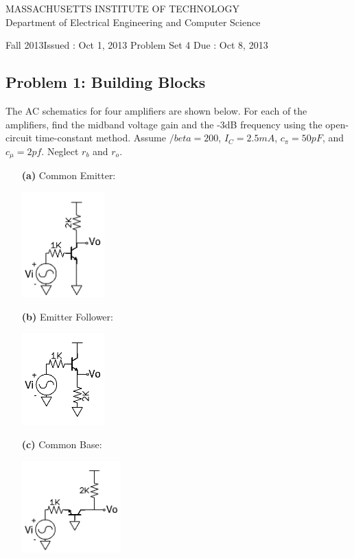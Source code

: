 \documentclass[11pt,twoside]{article}
\newlength{\toppush}
\newcommand{\htitle}[3]{\begin{center}
\vspace*{-\toppush}
{\large MASSACHUSETTS INSTITUTE OF TECHNOLOGY}\\
{\small Department of Electrical Engineering and Computer Science}\\
\vspace*{1ex}{\Large #2}\end{center}
\noindent
\newline\parbox{6.5in}
{Fall 2013\hfill Issued : #1 \newline
 Problem Set 4 \hfill Due : #3\newline
}}
\newcommand{\handout}[3]{\thispagestyle{empty}
\pagestyle{myheadings}\htitle{#1}{#2}{#3}}
\begin{document}
\handout{Oct 1, 2013}{6.301 Solid State Circuits}{Oct 8, 2013}
\setlength{\parindent}{0pt}

\newcommand{\solution}{
 \medskip
 {\bf Solution:}
}

\hrulefill

\flushleft

\subsection*{Problem 1: Building Blocks}
The AC schematics for four amplifiers are shown below.
For each of the amplifiers, find the midband voltage gain and the -3dB frequency using the open-circuit time-constant method.
Assume $/beta=200$, $I_C=2.5mA$, $c_\pi=50pF$, and $c_\mu=2pf$.
Neglect $r_b$ and $r_o$.
\begin{enumerate}
	\item[\bf(a)] Common Emitter:
\begin{center}
\includegraphics[width=0.25\textwidth]{ce.png}
\end{center}
	\item[\bf(b)] Emitter Follower:
\begin{center}
\includegraphics[width=0.25\textwidth]{ef.png}
\end{center}
\clearpage
	\item[\bf(c)] Common Base:
\begin{center}
\includegraphics[width=0.3\textwidth]{cb.png}

\end{center}
\end{enumerate}
\end{document}
